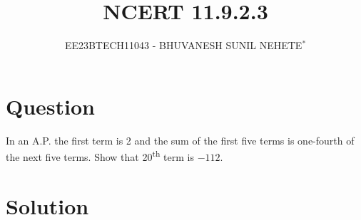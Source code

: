 \documentclass[journal,12pt,twocolumn]{IEEEtran}
\theoremstyle{remark}
\begin{document}

\vspace{3cm}

\title{NCERT 11.9.2.3}
\author{EE23BTECH11043 - BHUVANESH SUNIL NEHETE$^{*}$%
}
\maketitle
\newpage
\bigskip

\renewcommand{\thefigure}{\theenumi}
\renewcommand{\thetable}{\theenumi}



\section*{Question}

In an A.P. the first term is 2 and the sum of the first five terms is one-fourth of the next five terms. Show that 20\textsuperscript{th} term is $-112$.

\section*{Solution}


\end{document}
